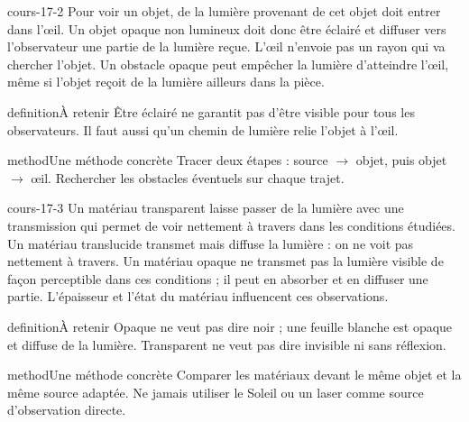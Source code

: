 \documentclass[12pt,twoside,openany]{book}
\begin{document}
\begin{pcFiche}{cours-17-2}
Pour voir un objet, de la lumière provenant de cet objet doit entrer dans l’œil. Un objet opaque non lumineux doit donc être éclairé et diffuser vers l’observateur une partie de la lumière reçue. L’œil n’envoie pas un rayon qui va chercher l’objet. Un obstacle opaque peut empêcher la lumière d’atteindre l’œil, même si l’objet reçoit de la lumière ailleurs dans la pièce.\par
{}
\begin{pcEncadre}{definition}{À retenir}
Être éclairé ne garantit pas d’être visible pour tous les observateurs. Il faut aussi qu’un chemin de lumière relie l’objet à l’œil.\par
\end{pcEncadre}
\begin{pcEncadre}{method}{Une méthode concrète}
Tracer deux étapes : source \(\rightarrow\) objet, puis objet \(\rightarrow\) œil. Rechercher les obstacles éventuels sur chaque trajet.\par
\end{pcEncadre}
\end{pcFiche}
\label{ch-17-cours-3}
\begin{pcFiche}{cours-17-3}
Un matériau transparent laisse passer de la lumière avec une transmission qui permet de voir nettement à travers dans les conditions étudiées. Un matériau translucide transmet mais diffuse la lumière : on ne voit pas nettement à travers. Un matériau opaque ne transmet pas la lumière visible de façon perceptible dans ces conditions ; il peut en absorber et en diffuser une partie. L’épaisseur et l’état du matériau influencent ces observations.\par
{}
\begin{pcEncadre}{definition}{À retenir}
Opaque ne veut pas dire noir ; une feuille blanche est opaque et diffuse de la lumière. Transparent ne veut pas dire invisible ni sans réflexion.\par
\end{pcEncadre}
\begin{pcEncadre}{method}{Une méthode concrète}
Comparer les matériaux devant le même objet et la même source adaptée. Ne jamais utiliser le Soleil ou un laser comme source d’observation directe.\par
\end{pcEncadre}
\end{pcFiche}
\end{document}
